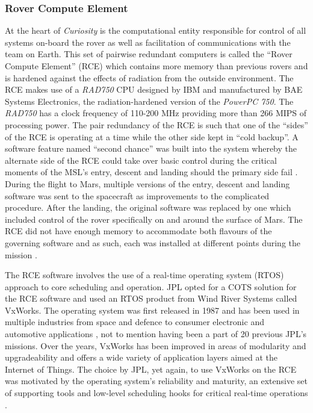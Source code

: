      \subsubsection{Rover Compute Element}
        At the heart of \textit{Curiosity} is the computational entity responsible for control of all systems on-board the rover as well as facilitation of communications with the team on Earth. This set of pairwise redundant computers is called the ``Rover Compute Element'' (RCE) which contains more memory than previous rovers and is hardened against the effects of radiation from the outside environment. The RCE makes use of a \textit{RAD750} CPU designed by IBM and manufactured by BAE Systems Electronics, the radiation-hardened version of the \textit{PowerPC 750}. The \textit{RAD750} has a clock frequency of 110-200 MHz providing more than 266 MIPS of processing power. The pair redundancy of the RCE is such that one of the ``sides'' of the RCE is operating at a time while the other side kept in ``cold backup''. A software feature named ``second chance'' was built into the system whereby the alternate side of the RCE could take over basic control during the critical moments of the MSL's entry, descent and landing should the primary side fail \cite{nasajulypresskit}. During the flight to Mars, multiple versions of the entry, descent and landing software was sent to the spacecraft as improvements to the complicated procedure. After the landing, the original software was replaced by one which included control of the rover specifically on and around the surface of Mars. The RCE did not have enough memory to accommodate both flavours of the governing software and as such, each was installed at different points during the mission \cite{cnn2012milesoff}.
        
        The RCE software involves the use of a real-time operating system (RTOS) approach to core scheduling and operation. JPL opted for a COTS solution for the RCE software and used an RTOS product from Wind River Systems called VxWorks. The operating system was first released in 1987 and has been used in multiple industries from space and defence to consumer electronic and automotive applications \cite{electronicsdesign2011vxworks}, not to mention having been a part of 20 previous JPL's missions. Over the years, VxWorks has been improved in areas of modularity and upgradeability and offers a wide variety of application layers aimed at the Internet of Things. The choice by JPL, yet again, to use VxWorks on the RCE was motivated by the operating system's reliability and maturity, an extensive set of supporting tools and low-level scheduling hooks for critical real-time operations \cite{extremetech2012insidecuriosity}.
        
